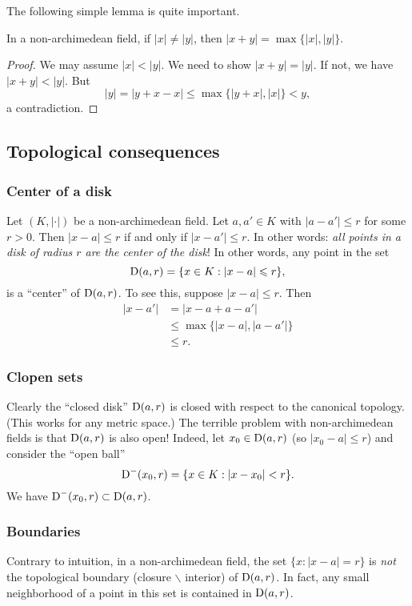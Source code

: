 The following simple lemma is quite important. 

\begin{lemma}
In a non-archimedean field, if $|x|\ne |y|$, then 
$|x+y|=\max\{|x|,|y|\}$. 
\end{lemma}
\begin{proof}
We may assume $|x|<|y|$. We need to show $|x+y|=|y|$. If not, we have 
$|x+y|<|y|$. But 
\[
  |y|=|y+x-x| \leqslant \max\{|y+x|,|x|\} < y ,
\]
a contradiction. 
\end{proof}





\subsection{Topological consequences}

\subsubsection{Center of a disk}

Let $(K,|\cdot|)$ be a non-archimedean field. Let $a,a'\in K$ with 
$|a-a'|\leqslant r$ for some $r>0$. Then $|x-a|\leqslant r$ if and only if 
$|x-a'|\leqslant r$. In other words: \emph{all points in a disk of radius $r$ 
are the center of the disk}! In other words, any point in the set  
\[
	\operatorname{D}(a,r) = \{x\in K:|x-a|\leqslant r\} ,
\]
is a ``center'' of $\operatorname{D}(a,r)$. To see this, suppose $|x-a|\leqslant r$. Then 
\begin{align*}
  |x-a'| 
    &= |x-a+a-a'| \\
    &\leqslant \max\{|x-a|,|a-a'|\} \\
    &\leqslant r .
\end{align*}

\subsubsection{Clopen sets}
Clearly the ``closed disk'' $\operatorname{D}(a,r)$ is closed with respect to the canonical 
topology. (This works for any metric space.) The terrible problem with 
non-archimedean fields is that $\operatorname{D}(a,r)$ is also open! Indeed, let 
$x_0\in \operatorname{D}(a,r)$ (so $|x_0-a|\leqslant r$) and consider the ``open ball'' 
\[
  \operatorname{D}^-(x_0,r) = \{x\in K:|x-x_0|<r\} .
\]
We have $\operatorname{D}^-(x_0,r)\subset \operatorname{D}(a,r)$. 

\subsubsection{Boundaries}
Contrary to intuition, in a non-archimedean field, the set 
$\{x\colon |x-a|=r\}$ is \emph{not} the topological boundary (closure 
$\smallsetminus$ interior) of $\operatorname{D}(a,r)$. In fact, any small neighborhood of 
a point in this set is contained in $\operatorname{D}(a,r)$. 

